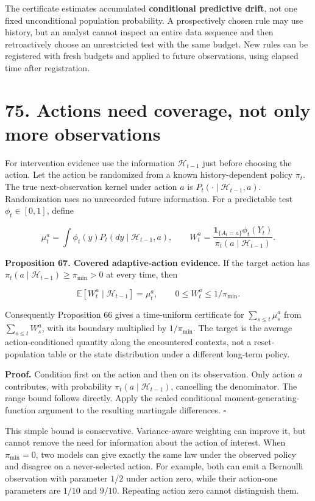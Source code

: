 \documentclass[11pt,letterpaper]{article}
\begin{document}
The certificate estimates accumulated \textbf{conditional predictive
drift}, not one fixed unconditional population probability. A
prospectively chosen rule may use history, but an analyst cannot inspect
an entire data sequence and then retroactively choose an unrestricted
test with the same budget. New rules can be registered with fresh
budgets and applied to future observations, using elapsed time after
registration.

\section{75. Actions need coverage, not only more
observations}\label{actions-need-coverage-not-only-more-observations}

For intervention evidence use the information \(\mathcal H_{t-1}\) just
before choosing the action. Let the action be randomized from a known
history-dependent policy \(\pi_t\). The true next-observation kernel
under action \(a\) is \(P_t(\cdot\mid\mathcal H_{t-1},a)\).
Randomization uses no unrecorded future information. For a predictable
test \(\phi_t\in[0,1]\), define

\[
\mu_t^a=\int\phi_t(y)P_t(dy\mid\mathcal H_{t-1},a),\qquad
W_t^a=\frac{\mathbf1_{\{A_t=a\}}\phi_t(Y_t)}{\pi_t(a\mid\mathcal H_{t-1})}.
\]

\textbf{Proposition 67. Covered adaptive-action evidence.} If the target
action has \(\pi_t(a\mid\mathcal H_{t-1})\geq\pi_{\min}>0\) at every
time, then

\[
\mathbb E[W_t^a\mid\mathcal H_{t-1}]=\mu_t^a,
\qquad 0\leq W_t^a\leq1/\pi_{\min}.
\]

Consequently Proposition 66 gives a time-uniform certificate for
\(\sum_{s\leq t}\mu_s^a\) from \(\sum_{s\leq t}W_s^a\), with its
boundary multiplied by \(1/\pi_{\min}\). The target is the average
action-conditioned quantity along the encountered contexts, not a
reset-population table or the state distribution under a different
long-term policy.

\textbf{Proof.} Condition first on the action and then on its
observation. Only action \(a\) contributes, with probability
\(\pi_t(a\mid\mathcal H_{t-1})\), cancelling the denominator. The range
bound follows directly. Apply the scaled conditional
moment-generating-function argument to the resulting martingale
differences. \(\square\)

This simple bound is conservative. Variance-aware weighting can improve
it, but cannot remove the need for information about the action of
interest. When \(\pi_{\min}=0\), two models can give exactly the same
law under the observed policy and disagree on a never-selected action.
For example, both can emit a Bernoulli observation with parameter
\(1/2\) under action zero, while their action-one parameters are
\(1/10\) and \(9/10\). Repeating action zero cannot distinguish them.
\end{document}
